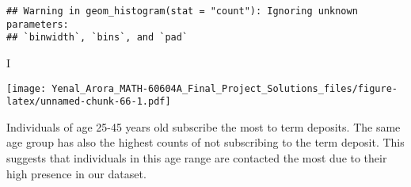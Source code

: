 \documentclass[
]{article}
\newenvironment{Shaded}{\begin{snugshade}}{\end{snugshade}}
\newcommand{\AttributeTok}[1]{\textcolor[rgb]{0.77,0.63,0.00}{#1}}
\newcommand{\CommentTok}[1]{\textcolor[rgb]{0.56,0.35,0.01}{\textit{#1}}}
\newcommand{\DecValTok}[1]{\textcolor[rgb]{0.00,0.00,0.81}{#1}}
\newcommand{\FloatTok}[1]{\textcolor[rgb]{0.00,0.00,0.81}{#1}}
\newcommand{\FunctionTok}[1]{\textcolor[rgb]{0.00,0.00,0.00}{#1}}
\newcommand{\NormalTok}[1]{#1}
\newcommand{\OtherTok}[1]{\textcolor[rgb]{0.56,0.35,0.01}{#1}}
\newcommand{\SpecialCharTok}[1]{\textcolor[rgb]{0.00,0.00,0.00}{#1}}
\newcommand{\StringTok}[1]{\textcolor[rgb]{0.31,0.60,0.02}{#1}}
\begin{document}
\begin{verbatim}
## Warning in geom_histogram(stat = "count"): Ignoring unknown parameters:
## `binwidth`, `bins`, and `pad`
\end{verbatim}

\begin{Shaded}
\begin{Highlighting}[]
\NormalTok{I}
\end{Highlighting}
\end{Shaded}

\texttt{[image: Yenal\_Arora\_MATH-60604A\_Final\_Project\_Solutions\_files/figure-latex/unnamed-chunk-66-1.pdf]}

Individuals of age 25-45 years old subscribe the most to term deposits.
The same age group has also the highest counts of not subscribing to the
term deposit. This suggests that individuals in this age range are
contacted the most due to their high presence in our dataset.

\begin{Shaded}
\end{Shaded}
\end{document}
